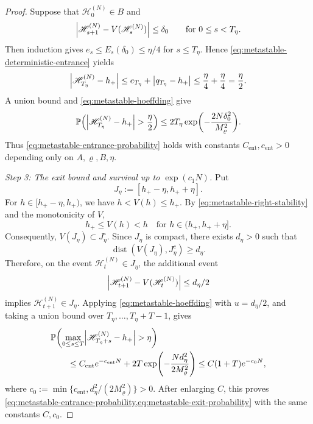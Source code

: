 \documentclass[11pt,reqno,a4paper]{article}
\newcommand{\Pp}{\P}
\begin{document}
\begin{proof}
  Suppose that
  $\mathscr H_0^{(N)}\in B$ and
  \begin{equation*}
    \abs{
      \mathscr H_{s+1}^{(N)}-V(\mathscr H_s^{(N)})
    }
    \leq\delta_0
    \qquad\mbox{for }0\leq s<T_\eta.
  \end{equation*}
  Then induction gives
  $e_s\leq E_s(\delta_0)\leq\eta/4$ for $s\leq T_\eta$. Hence
  \cref{eq:metastable-deterministic-entrance} yields
  \begin{equation*}
    \abs{\mathscr H_{T_\eta}^{(N)}-h_+}
    \leq
    e_{T_\eta}+\abs{q_{T_\eta}-h_+}
    \leq
    \frac\eta4+\frac\eta4
    =\frac\eta2.
  \end{equation*}
  A union bound and \cref{eq:metastable-hoeffding} give
  \begin{equation*}
    \Pp\left(
      \abs{\mathscr H_{T_\eta}^{(N)}-h_+}>\frac\eta2
    \right)
    \leq
    2T_\eta
      \exp\left(-\frac{2N\delta_0^2}{M_\varrho^2}\right).
  \end{equation*}
  Thus \cref{eq:metastable-entrance-probability} holds with constants
  $C_{\mathrm{ent}},c_{\mathrm{ent}}>0$ depending only on
  $A,\varrho,B,\eta$.

  \emph{Step 3: The exit bound and survival up to $\exp(c_1N)$.}
  Put
  \begin{equation*}
    J_\eta:=[h_+-\eta,h_++\eta].
  \end{equation*}
  For $h\in[h_+-\eta,h_+)$, we have $h<V(h)\leq h_+$. By
  \cref{eq:metastable-right-stability} and the monotonicity of $V$,
  \begin{equation*}
    h_+\leq V(h)<h
    \quad\mbox{for }h\in(h_+,h_++\eta].
  \end{equation*}
  Consequently, $V(J_\eta)\subset J_\eta^\circ$. Since $J_\eta$ is compact,
  there exists
  $d_\eta>0$ such that
  \begin{equation*}
    \operatorname{dist}(V(J_\eta),J_\eta^c)\geq d_\eta .
  \end{equation*}
  Therefore, on the event $\mathscr H_t^{(N)}\in J_\eta$, the additional event
  \begin{equation*}
    \abs{\mathscr H_{t+1}^{(N)}-V(\mathscr H_t^{(N)})}\leq d_\eta/2
  \end{equation*}
  implies $\mathscr H_{t+1}^{(N)}\in J_\eta$. Applying
  \cref{eq:metastable-hoeffding} with $u=d_\eta/2$, and taking a union bound
  over $T_\eta,\ldots,T_\eta+T-1$, gives
  \begin{align*}
    &\Pp\left(
      \max_{0\leq s\leq T}
      \abs{\mathscr H_{T_\eta+s}^{(N)}-h_+}>\eta
    \right)
    \\
    &\qquad\leq
    C_{\mathrm{ent}}e^{-c_{\mathrm{ent}}N}
    +2T\exp\left(-\frac{Nd_\eta^2}{2M_\varrho^2}\right)
    \leq
    C(1+T)e^{-c_0N},
  \end{align*}
  where
  $c_0:=\min\{c_{\mathrm{ent}},d_\eta^2/(2M_\varrho^2)\}>0$.
  After enlarging $C$, this proves
  \cref{eq:metastable-entrance-probability,eq:metastable-exit-probability}
  with the same constants $C,c_0$.


\end{proof}
\end{document}
